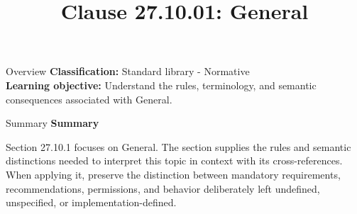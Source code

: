 \documentclass[10pt,letterpaper]{article}
\title{Clause 27.10.01: General}
\author{}
\date{}
\begin{document}
\maketitle
\begin{CornellOverviewBox}{Overview}
\textbf{Classification:} Standard library - Normative\\[2pt]
\textbf{Learning objective:} Understand the rules, terminology, and semantic consequences associated with General.
\end{CornellOverviewBox}\begin{CornellSummaryBox}{Summary}
{\sffamily\bfseries\color{Accent} Summary}\par\vspace{3pt}Section 27.10.1 focuses on General. The section supplies the rules and semantic distinctions needed to interpret this topic in context with its cross-references. When applying it, preserve the distinction between mandatory requirements, recommendations, permissions, and behavior deliberately left undefined, unspecified, or implementation-defined.
\end{CornellSummaryBox}
\end{document}
